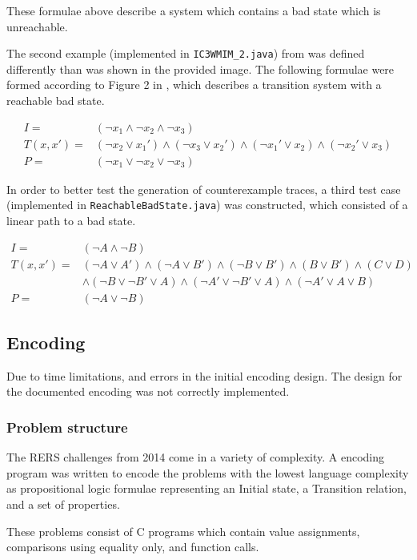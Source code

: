 \documentclass[a4paper]{article}
\begin{document}
These formulae above describe a system which contains a bad state which is unreachable.

The second example (implemented in \texttt{IC3WMIM\_2.java}) from \cite{Somenzi2011} was defined differently than was shown in the provided image.
The following formulae were formed according to Figure 2 in \cite{Somenzi2011}, which describes a transition system with a reachable bad state.

\begin{align*}
I =& (\lnot x_1 \land \lnot x_2 \land \lnot x_3)\\
T(x,x') =& (\lnot x_2 \lor x_1') \land (\lnot x_3 \lor x_2') \land (\lnot x_1' \lor x_2) \land (\lnot x_2' \lor x_3)\\
P =& (\lnot x_1 \lor \lnot x_2 \lor \lnot x_3)
\end{align*}

In order to better test the generation of counterexample traces, a third test case (implemented in \texttt{ReachableBadState.java}) was constructed, which consisted of a linear path to a bad state.

\begin{align*}
I =& (\lnot A \land \lnot B)\\
T(x,x') =& (\lnot A \lor A') \land (\lnot A \lor B') \land (\lnot B \lor B') \land (B \lor B') \land (C \lor D)\\
&\land (\lnot B \lor \lnot B' \lor A) \land (\lnot A' \lor \lnot B' \lor A) \land (\lnot A' \lor A \lor B)\\
P =& (\lnot A \lor \lnot B)
\end{align*}

\subsection{Encoding}
\label{sec:enc}
Due to time limitations, and errors in the initial encoding design. The design for the documented encoding was not correctly implemented.

\subsubsection{Problem structure}
The RERS challenges from 2014 come in a variety of complexity. A encoding program was written to encode the problems with the lowest language complexity as propositional logic formulae representing an Initial state, a Transition relation, and a set of properties.

These problems consist of C programs which contain value assignments, comparisons using equality only, and function calls.
\end{document}
